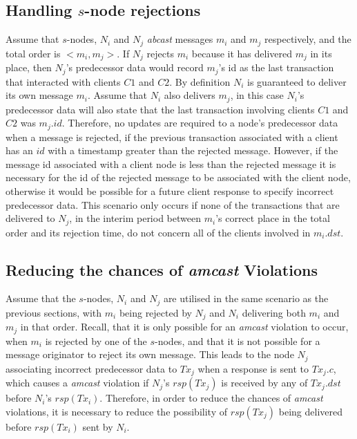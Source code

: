     \subsection{Handling $s$-node rejections}
    Assume that $s$-nodes, $N_i$ and $N_j$ \emph{abcast} messages $m_i$ and $m_j$ respectively, and the total order is $<m_i, m_j>$.  If $N_j$ rejects $m_i$ because it has delivered $m_j$ in its place, then $N_j$'s predecessor data would record $m_j$'s id as the last transaction that interacted with clients $C1$ and $C2$.  By definition $N_i$ is guaranteed to deliver its own message $m_i$.  Assume that $N_i$ also delivers $m_j$, in this case $N_i$'s predecessor data will also state that the last transaction involving clients $C1$ and $C2$ was $m_j.id$.  Therefore, no updates are required to a node's predecessor data when a message is rejected, if the previous transaction associated with a client has an $id$ with a timestamp greater than the rejected message.  However, if the message id associated with a client node is less than the rejected message it is necessary for the id of the rejected message to be associated with the client node, otherwise it would be possible for a future client response to specify incorrect predecessor data.  This scenario only occurs if none of the transactions that are delivered to $N_j$, in the interim period between $m_i$'s correct place in the total order and its rejection time, do not concern all of the clients involved in $m_i.dst$.  
        
    \subsection{Reducing the chances of \emph{amcast} Violations}
    Assume that the $s$-nodes, $N_i$ and $N_j$ are utilised in the same scenario as the previous sections, with $m_i$ being rejected by $N_j$ and $N_i$ delivering both $m_i$ and $m_j$ in that order.  Recall, that it is only possible for an \emph{amcast} violation to occur, when $m_i$ is rejected by one of the $s$-nodes, and that it is not possible for a message originator to reject its own message.  This leads to the node $N_j$ associating incorrect predecessor data to $Tx_j$ when a response is sent to $Tx_j.c$, which causes a \emph{amcast} violation if $N_j$'s $rsp(Tx_j)$ is received by any of $Tx_j.dst$ before $N_i$'s $rsp(Tx_i)$.  Therefore, in order to reduce the chances of \emph{amcast} violations, it is necessary to reduce the possibility of $rsp(Tx_j)$ being delivered before $rsp(Tx_i)$ sent by $N_i$.  
    
